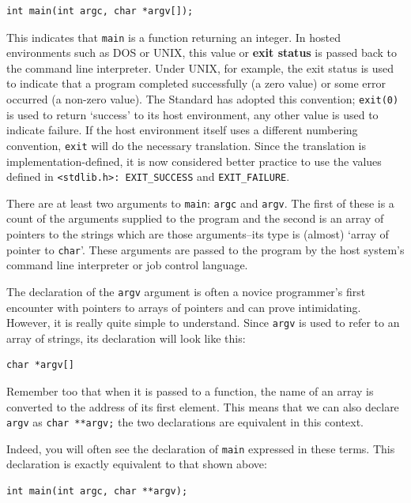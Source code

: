   \begin{Verbatim}
int main(int argc, char *argv[]);
\end{Verbatim}

  This indicates that \texttt{main} is a function returning an
   integer. In hosted environments such as DOS or UNIX, this value or
   \textbf{exit status} is passed back to the command line interpreter. Under
   UNIX, for example, the exit status is used to indicate that a program
   completed successfully (a zero value) or some error occurred (a non-zero
   value). The Standard has adopted this convention; \texttt{exit(0)} is
   used to return `success' to its host environment, any other value is
   used to indicate failure. If the host environment itself uses a different
   numbering convention, \texttt{exit} will do the necessary
   translation. Since the translation is implementation-defined, it is now
   considered better practice to use the values defined in
   \texttt{<stdlib.h>: EXIT\_SUCCESS} and
   \texttt{EXIT\_FAILURE}.


  There are at least two arguments to \texttt{main}:
   \texttt{argc} and \texttt{argv}.  The first of these is a count
   of the arguments supplied to the program and the second is an array of
   pointers to the strings which are those arguments--its type is
   (almost) `array of pointer to \texttt{char}'. These arguments
   are passed to the program by the host system's command line interpreter
   or job control language.


  The declaration of the \texttt{argv} argument is often a novice
   programmer's first encounter with pointers to arrays of pointers and can
   prove intimidating. However, it is really quite simple to understand.
   Since \texttt{argv} is used to refer to an array of strings, its
   declaration will look like this:


  \begin{Verbatim}
char *argv[]
\end{Verbatim}

  Remember too that when it is passed to a function, the name of an array
   is converted to the address of its first element. This means that we can
   also declare \texttt{argv} as \texttt{char **argv;} the two
   declarations are equivalent in this context.


  Indeed, you will often see the declaration of \texttt{main}
   expressed in these terms. This declaration is exactly equivalent to that
   shown above:


  \begin{Verbatim}
int main(int argc, char **argv);
\end{Verbatim}

